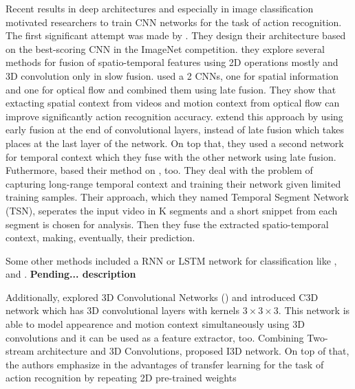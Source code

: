 \documentclass{report}
\begin{document}
Recent results in deep architectures and especially in image classification motivated researchers to train CNN networks for
the task of action recognition. The first significant attempt was made by \cite{6909619}. They design their architecture based on the best-scoring CNN
in the ImageNet competition. they explore several methods for fusion of spatio-temporal features using 2D operations mostly and 3D convolution only in slow fusion.
\cite{simonyan2014two}  used a 2 CNNs, one for spatial information and one for optical flow and combined them using late fusion.
They show that extacting spatial context from videos and motion context from optical flow can improve significantly action recognition accuracy.
\cite{DBLP:journals/corr/FeichtenhoferPZ16} extend this approach by using early fusion at the end of convolutional layers,  instead of late fusion which
takes places at the last layer of the network. On top that, they used a second network for temporal context which they fuse with the other network using late
fusion. Futhermore, \cite{DBLP:journals/corr/WangXW0LTG16} based their method on \cite{simonyan2014two}, too. They deal with the problem of capturing long-range
temporal context and training their network given limited training samples. Their approach, which they named Temporal Segment Network (TSN), seperates the input
video in K segments and a short snippet from each segment is chosen for analysis. Then they fuse  the extracted spatio-temporal context, making, eventually, their
prediction. \par
Some other methods included a RNN or LSTM network for classification like \cite{DBLP:journals/corr/DonahueHGRVSD14}, \cite{DBLP:journals/corr/NgHVVMT15} and
\cite{DBLP:journals/corr/MaCKA17}. \textbf{Pending... description} \par
Additionally, \cite{Tran2014LearningSF} explored 3D Convolutional Networks (\cite{pmid:22392705}) and introduced C3D network which  has
3D convolutional layers with kernels $ 3 \times 3 \times 3$.
This network is able to  model appearence and motion context simultaneously using 3D convolutions and it can be used as a feature extractor, too.
Combining Two-stream architecture and 3D Convolutions, \cite{DBLP:journals/corr/CarreiraZ17} proposed
I3D network. On top of that, the authors emphasize in the advantages of transfer learning for the task of action recognition by repeating 2D pre-trained weights
\end{document}
